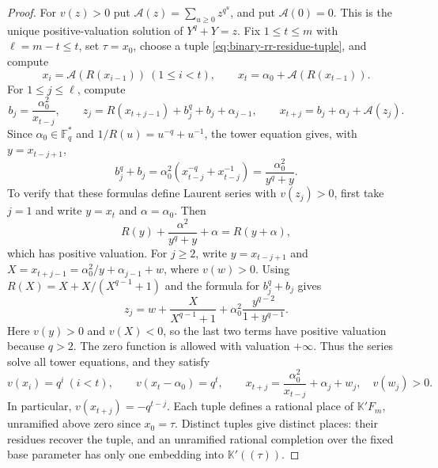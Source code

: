 \documentclass[11pt,letterpaper]{article}
\numberwithin{equation}{section}
\begin{document}
\begin{proof}
For $v(z)>0$ put $\mathcal A(z)=\sum_{u\geq0}z^{q^u}$, and put $\mathcal A(0)=0$.
This is the unique positive-valuation solution of $Y^q+Y=z$.
Fix $1\leq t\leq m$ with $\ell=m-t\leq t$, set $\tau=x_0$, choose a tuple \eqref{eq:binary-rr-residue-tuple}, and compute
\begin{equation}
 x_i=\mathcal A(R(x_{i-1}))\ (1\leq i<t),\qquad
 x_t=\alpha_0+\mathcal A(R(x_{t-1})).
 \label{eq:binary-rr-positive-recursion}
\end{equation}
For $1\leq j\leq\ell$, compute
\begin{equation}
 b_j=\frac{\alpha_0^2}{x_{t-j}},\qquad
 z_j=R(x_{t+j-1})+b_j^q+b_j+\alpha_{j-1},\qquad
 x_{t+j}=b_j+\alpha_j+\mathcal A(z_j).
 \label{eq:binary-rr-polar-recursion}
\end{equation}
Since $\alpha_0\in\mathbb F_q^*$ and $1/R(u)=u^{-q}+u^{-1}$, the tower equation gives, with $y=x_{t-j+1}$,
\[
 b_j^q+b_j=\alpha_0^2(x_{t-j}^{-q}+x_{t-j}^{-1})
          =\frac{\alpha_0^2}{y^q+y}.
\]
To verify that these formulas define Laurent series with $v(z_j)>0$, first take $j=1$ and write $y=x_t$ and $\alpha=\alpha_0$.
Then
\[
 R(y)+\frac{\alpha^2}{y^q+y}+\alpha=R(y+\alpha),
\]
which has positive valuation.
For $j\geq2$, write $y=x_{t-j+1}$ and $X=x_{t+j-1}=\alpha_0^2/y+\alpha_{j-1}+w$, where $v(w)>0$.
Using $R(X)=X+X/(X^{q-1}+1)$ and the formula for $b_j^q+b_j$ gives
\[
 z_j=w+\frac{X}{X^{q-1}+1}
       +\alpha_0^2\frac{y^{q-2}}{1+y^{q-1}}.
\]
Here $v(y)>0$ and $v(X)<0$, so the last two terms have positive valuation because $q>2$.
The zero function is allowed with valuation $+\infty$.
Thus the series solve all tower equations, and they satisfy
\begin{equation}
 v(x_i)=q^i\ (i<t),\qquad v(x_t-\alpha_0)=q^t,\qquad
 x_{t+j}=\frac{\alpha_0^2}{x_{t-j}}+\alpha_j+w_j,
 \quad v(w_j)>0.
 \label{eq:binary-rr-local-expansion}
\end{equation}
In particular, $v(x_{t+j})=-q^{t-j}$.
Each tuple defines a rational place of $\mathbb K'F_m$, unramified above zero since $x_0=\tau$.
Distinct tuples give distinct places: their residues recover the tuple, and an unramified rational completion over the fixed base parameter has only one embedding into $\mathbb K'((\tau))$.


\end{proof}
\end{document}

